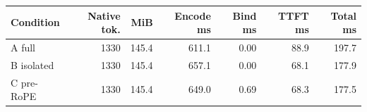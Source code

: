 \begin{tabular}{lrrrrrr}
\toprule
Condition & Native tok. & MiB & Encode ms & Bind ms & TTFT ms & Total ms \\
\midrule
A full & 1330 & 145.4 & 611.1 & 0.00 & 88.9 & 197.7 \\
B isolated & 1330 & 145.4 & 657.1 & 0.00 & 68.1 & 177.9 \\
C pre-RoPE & 1330 & 145.4 & 649.0 & 0.69 & 68.3 & 177.5 \\
\bottomrule
\end{tabular}
